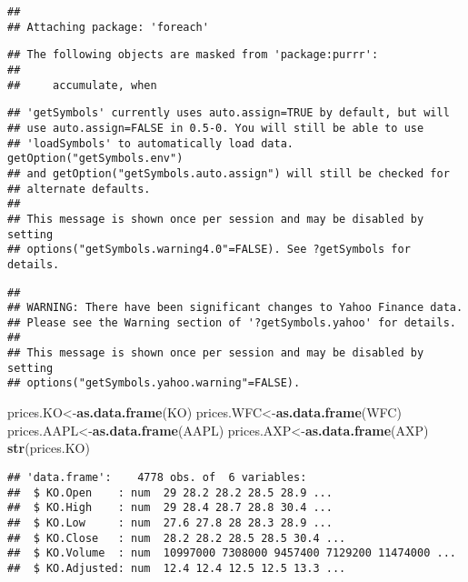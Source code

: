 \documentclass[]{article}
\newenvironment{Shaded}{\begin{snugshade}}{\end{snugshade}}
\newcommand{\KeywordTok}[1]{\textcolor[rgb]{0.13,0.29,0.53}{\textbf{#1}}}
\newcommand{\NormalTok}[1]{#1}
\begin{document}
\begin{verbatim}
## 
## Attaching package: 'foreach'
\end{verbatim}

\begin{verbatim}
## The following objects are masked from 'package:purrr':
## 
##     accumulate, when
\end{verbatim}

\begin{verbatim}
## 'getSymbols' currently uses auto.assign=TRUE by default, but will
## use auto.assign=FALSE in 0.5-0. You will still be able to use
## 'loadSymbols' to automatically load data. getOption("getSymbols.env")
## and getOption("getSymbols.auto.assign") will still be checked for
## alternate defaults.
## 
## This message is shown once per session and may be disabled by setting 
## options("getSymbols.warning4.0"=FALSE). See ?getSymbols for details.
\end{verbatim}

\begin{verbatim}
## 
## WARNING: There have been significant changes to Yahoo Finance data.
## Please see the Warning section of '?getSymbols.yahoo' for details.
## 
## This message is shown once per session and may be disabled by setting
## options("getSymbols.yahoo.warning"=FALSE).
\end{verbatim}

\begin{Shaded}
\begin{Highlighting}[]
\NormalTok{prices.KO<-}\KeywordTok{as.data.frame}\NormalTok{(KO)}
\NormalTok{prices.WFC<-}\KeywordTok{as.data.frame}\NormalTok{(WFC)}
\NormalTok{prices.AAPL<-}\KeywordTok{as.data.frame}\NormalTok{(AAPL)}
\NormalTok{prices.AXP<-}\KeywordTok{as.data.frame}\NormalTok{(AXP)}
\KeywordTok{str}\NormalTok{(prices.KO)}
\end{Highlighting}
\end{Shaded}

\begin{verbatim}
## 'data.frame':    4778 obs. of  6 variables:
##  $ KO.Open    : num  29 28.2 28.2 28.5 28.9 ...
##  $ KO.High    : num  29 28.4 28.7 28.8 30.4 ...
##  $ KO.Low     : num  27.6 27.8 28 28.3 28.9 ...
##  $ KO.Close   : num  28.2 28.2 28.5 28.5 30.4 ...
##  $ KO.Volume  : num  10997000 7308000 9457400 7129200 11474000 ...
##  $ KO.Adjusted: num  12.4 12.4 12.5 12.5 13.3 ...
\end{verbatim}

\setlength\parskip{5ex}
\justifying
\end{document}
